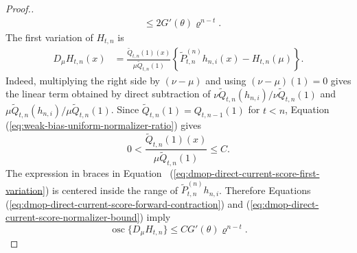 \documentclass[11pt]{article}
\theoremstyle{thmstylethree}%
\begin{document}
\begin{proof}[Proof.]
\begin{align}
&\leq
2G'(\theta)\varrho^{n-t}.
\label{eq:dmop-direct-current-score-forward-contraction}
\end{align}
The first variation of $H_{t,n}$ is
\begin{align}
D_\mu H_{t,n}(x)
&=
\frac{\widetilde Q_{t,n}(1)(x)}
{\mu\widetilde Q_{t,n}(1)}
\left\{
\widetilde P_{t,n}^{(n)}h_{n,i}(x)-H_{t,n}(\mu)
\right\}.
\label{eq:dmop-direct-current-score-first-variation}
\end{align}
Indeed, multiplying the right side by $(\nu-\mu)$ and using
$(\nu-\mu)(1)=0$ gives the linear term obtained by direct subtraction of
$\nu\widetilde Q_{t,n}(h_{n,i})/
\nu\widetilde Q_{t,n}(1)$ and
$\mu\widetilde Q_{t,n}(h_{n,i})/
\mu\widetilde Q_{t,n}(1)$.  Since
$\widetilde Q_{t,n}(1)=Q_{t,n-1}(1)$ for $t<n$, Equation~
(\ref{eq:weak-bias-uniform-normalizer-ratio}) gives
\begin{equation}
0<
\frac{\widetilde Q_{t,n}(1)(x)}
{\mu\widetilde Q_{t,n}(1)}
\leq C.
\label{eq:dmop-direct-current-score-normalizer-bound}
\end{equation}
The expression in braces in Equation~
(\ref{eq:dmop-direct-current-score-first-variation}) is centered inside
the range of $\widetilde P_{t,n}^{(n)}h_{n,i}$.  Therefore Equations~
(\ref{eq:dmop-direct-current-score-forward-contraction}) and
(\ref{eq:dmop-direct-current-score-normalizer-bound}) imply
\begin{equation}
\operatorname{osc}\{D_\mu H_{t,n}\}
\leq
CG'(\theta)\varrho^{n-t}.
\label{eq:dmop-direct-current-score-derivative-bound}
\end{equation}


\end{proof}
\end{document}
